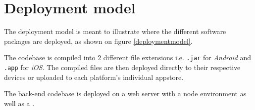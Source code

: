 \section{Deployment model}
The deployment model is meant to illustrate where the different software packages are deployed, as shown on figure \ref{deploymentmodel}.

The  codebase is compiled into 2 different file extensions i.e. \verb+.jar+ for \textit{Android} and \verb+.app+ for \textit{iOS}. The compiled files are then deployed directly to their respective devices or uploaded to each platform's individual \gls{appstore}.

The back-end codebase is deployed on a web server with a \gls{node} environment as well as a .


